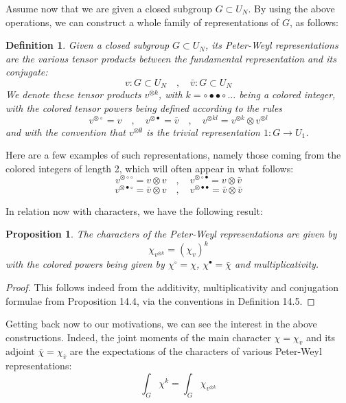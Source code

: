 \documentclass[12pt]{amsbook}
\newtheorem{definition}[theorem]{Definition}
\newtheorem{proposition}[theorem]{Proposition}
\begin{document}
Assume now that we are given a closed subgroup $G\subset U_N$. By using the above operations, we can construct a whole family of representations of $G$, as follows:


\begin{definition}
Given a closed subgroup $G\subset U_N$, its Peter-Weyl representations are the various tensor products between the fundamental representation and its conjugate:
$$v:G\subset U_N\quad,\quad 
\bar{v}:G\subset U_N$$ 
We denote these tensor products $v^{\otimes k}$, with $k=\circ\bullet\bullet\circ\ldots$ being a colored integer, with the colored tensor powers being defined according to the rules 
$$v^{\otimes\circ}=v\quad,\quad
v^{\otimes\bullet}=\bar{v}\quad,\quad
v^{\otimes kl}=v^{\otimes k}\otimes v^{\otimes l}$$
and with the convention that $v^{\otimes\emptyset}$ is the trivial representation $1:G\to U_1$.
\end{definition}

Here are a few examples of such representations, namely those coming from the colored integers of length 2, which will often appear in what follows:
$$v^{\otimes\circ\circ}=v\otimes v\quad,\quad 
v^{\otimes\circ\bullet}=v\otimes\bar{v}$$
$$v^{\otimes\bullet\circ}=\bar{v}\otimes v\quad,\quad
v^{\otimes\bullet\bullet}=\bar{v}\otimes\bar{v}$$

In relation now with characters, we have the following result:


\begin{proposition}
The characters of the Peter-Weyl representations are given by
$$\chi_{v^{\otimes k}}=(\chi_v)^k$$
with the colored powers being given by $\chi^\circ=\chi$, $\chi^\bullet=\bar{\chi}$ and multiplicativity.
\end{proposition}

\begin{proof}
This follows indeed from the additivity, multiplicativity and conjugation formulae from Proposition 14.4, via the conventions in Definition 14.5.
\end{proof}

Getting back now to our motivations, we can see the interest in the above constructions. Indeed, the joint moments of the main character $\chi=\chi_v$ and its adjoint $\bar{\chi}=\chi_{\bar{v}}$ are the expectations of the characters of various Peter-Weyl representations: 
$$\int_G\chi^k=\int_G \chi_{v^{\otimes k}}$$
\end{document}
